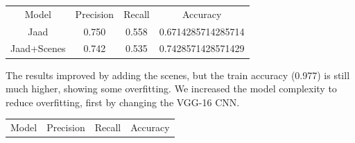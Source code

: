 \documentclass[11pt]{article}
\begin{document}
    \begin{center}
    \begin{tabular}{| c c c c |}\hline
     Model & Precision & Recall & Accuracy\\
     Jaad & 0.750 & 0.558 & 0.6714285714285714 \\
     Jaad+Scenes & 0.742 & 0.535 & 0.7428571428571429\\
    \end{tabular}
    \end{center}

    The results improved by adding the scenes, but the train accuracy (0.977) is still much higher, showing some overfitting.
    We increased the model complexity to reduce overfitting, first by changing the VGG-16 CNN.

    \begin{center}
    \begin{tabular}{| c c c c |}\hline
    Model & Precision & Recall & Accuracy\\

    \end{tabular}
    \end{center}
\end{document}
